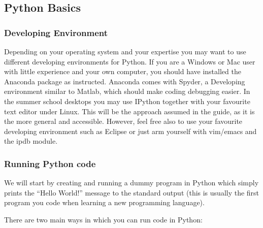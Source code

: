 \subsection{Python Basics}

\subsubsection{Developing Environment}

Depending on your operating system and your expertise you may want to use
different developing environments for Python. If you are a Windows or Mac user
with little experience and your own computer, you should have installed the
Anaconda package as instructed. Anaconda comes with Spyder, a Developing
environment similar to Matlab, which should make coding debugging easier. In
the summer school desktops you may use IPython together with your favourite
text editor under Linux. This will be the approach assumed in the guide, as it
is the more general and accessible. However, feel free also to use your 
favourite developing environment such as Eclipse or just arm yourself with
vim/emacs and the ipdb module. 

\subsubsection{Running Python code}

We will start by creating and running a dummy program in Python which simply
prints the ``Hello World!'' message to the standard output (this is usually the
first program you code when learning a new programming language). 

There are two main ways in which you can run code in Python: 


